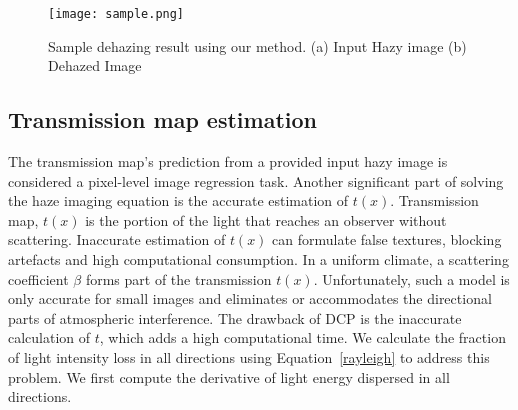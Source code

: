 \documentclass[doctor,english,listoffigures,listoftables]{thesis-uestc}
\begin{document}
\begin{figure}[H]
	\centering
	\texttt{[image: sample.png]}
	\caption{Sample dehazing result using our method. (a) Input Hazy image (b) Dehazed Image}
	\label{s}
\end{figure}
\subsection{Transmission map estimation}
The transmission map's prediction from a provided input hazy image is considered a pixel-level image regression task.
Another significant part of solving the haze imaging equation is the accurate estimation of $t(x)$. Transmission map, $t(x)$ is the portion of the light that reaches an observer without scattering. Inaccurate estimation of $t(x)$ can formulate false textures, blocking artefacts and high computational consumption. In a uniform climate, a scattering coefficient $\beta$ forms part of the transmission $t(x)$. Unfortunately, such a model is only accurate for small images and eliminates or accommodates the directional parts of atmospheric interference. The drawback of DCP is the inaccurate calculation of $t$, which adds a high computational time. We calculate the fraction of light intensity loss in all directions using Equation~\ref{rayleigh} to address this problem. We first compute the derivative of light energy dispersed in all directions.
\end{document}
